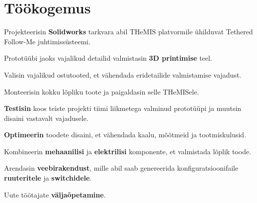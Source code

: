 \documentclass[letterpaper]{deedy-resume} %
\begin{document}
\hfill
%
%
\begin{minipage}[t]{0.66\textwidth} %


\section{Töökogemus}


\vspace{\topsep} %
\begin{tightitemize}
  \item Projekteerisin \textbf{Solidworks} tarkvara abil THeMIS platvormile ühilduvat Tethered Follow-Me juhtimissüsteemi.
  \item Prototüübi jaoks vajalikud detailid valmistasin \textbf{3D printimise} teel.
  \item Valisin vajalikud ostutooted, et vähendada eridetailide valmistamise vajadust.
  \item Monteerisin kokku lõpliku toote ja paigaldasin selle THeMISele.
  \item \textbf{Testisin} koos teiste projekti tiimi liikmetega valminud prototüüpi ja muutsin disaini vastavalt vajadusele.
  \item \textbf{Optimeerin} toodete disaini, et vähendada kaalu, mõõtmeid ja tootmiskulusid.
  \item Kombineerin \textbf{mehaanilisi} ja \textbf{elektrilisi} komponente, et valmistada lõplik toode.
\end{tightitemize}

\sectionspace %


\begin{tightitemize}
  \item Arendasin \textbf{veebirakendust}, mille abil saab genereerida konfiguratsioonifaile \textbf{ruuteritele} ja \textbf{switchidele}.
  \item Uute töötajate \textbf{väljaõpetamine}.
\end{tightitemize}


\end{minipage}
\end{document}

